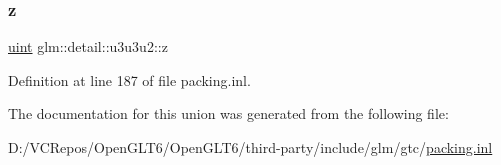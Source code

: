 \mbox{\label{unionglm_1_1detail_1_1u3u3u2_a53e88031a04c880792dd6e36f8e96f9a}} 
\subsubsection{\texorpdfstring{z}{z}}
{\footnotesize\ttfamily \mbox{\hyperlink{group__core__precision_ga4fd29415871152bfb5abd588334147c8}{uint}} glm\+::detail\+::u3u3u2\+::z}



Definition at line 187 of file packing.\+inl.



The documentation for this union was generated from the following file\+:\begin{DoxyCompactItemize}
\item 
D\+:/\+V\+C\+Repos/\+Open\+G\+L\+T6/\+Open\+G\+L\+T6/third-\/party/include/glm/gtc/\mbox{\hyperlink{packing_8inl}{packing.\+inl}}\end{DoxyCompactItemize}
